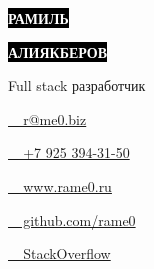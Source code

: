 \documentclass[10pt]{tpl/developercv} %
\begin{document}

\begin{minipage}[t]{0.44\textwidth} %
	\vspace{-\baselineskip} %

	\colorbox{black}{{\Huge\textcolor{white}{\textbf{\MakeUppercase{Рамиль}}}}} %

	\colorbox{black}{{\Huge\textcolor{white}{\textbf{\MakeUppercase{Алиякберов}}}}} %

	\vspace{6pt}

	{\huge Full stack разработчик} %
\end{minipage}
\begin{minipage}[t]{0.275\textwidth} %
	\vspace{-\baselineskip} %


	\href{mailto:r@me0.biz}{_ r@me0.biz}

	\href{tel:+7925394310}{_ +7 925 394-31-50}
\end{minipage}
\begin{minipage}[t]{0.275\textwidth} %
	\vspace{-\baselineskip} %

	\href{https://www.rame0.ru/}{_ www.rame0.ru}

	\href{https://github.com/rame0}{_ github.com/rame0}

	\href{https://stackoverflow.com/users/513723/rame0}{_ StackOverflow}
\end{minipage}
\end{document}
